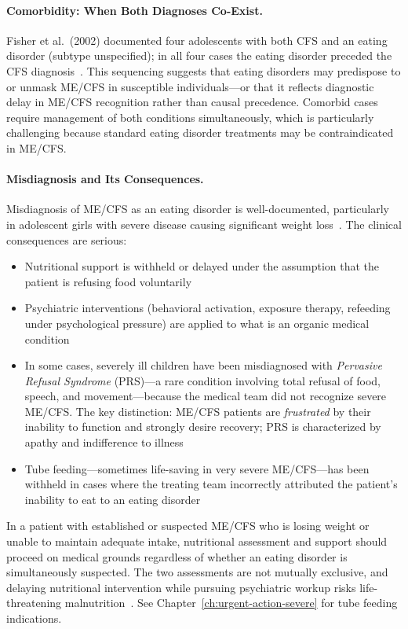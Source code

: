 \paragraph{Comorbidity: When Both Diagnoses Co-Exist.}
Fisher et al.\ (2002) documented four adolescents with both CFS and an eating disorder (subtype unspecified); in all four cases the eating disorder preceded the CFS diagnosis~\cite{Fisher2002cfs-ed}. This sequencing suggests that eating disorders may predispose to or unmask ME/CFS in susceptible individuals---or that it reflects diagnostic delay in ME/CFS recognition rather than causal precedence. Comorbid cases require management of both conditions simultaneously, which is particularly challenging because standard eating disorder treatments may be contraindicated in ME/CFS.

\paragraph{Misdiagnosis and Its Consequences.}
Misdiagnosis of ME/CFS as an eating disorder is well-documented, particularly in adolescent girls with severe disease causing significant weight loss~\cite{Baxter2021malnutrition}. The clinical consequences are serious:

\begin{itemize}
    \item Nutritional support is withheld or delayed under the assumption that the patient is refusing food voluntarily
    \item Psychiatric interventions (behavioral activation, exposure therapy, refeeding under psychological pressure) are applied to what is an organic medical condition
    \item In some cases, severely ill children have been misdiagnosed with \emph{Pervasive Refusal Syndrome} (PRS)---a rare condition involving total refusal of food, speech, and movement---because the medical team did not recognize severe ME/CFS. The key distinction: ME/CFS patients are \emph{frustrated} by their inability to function and strongly desire recovery; PRS is characterized by apathy and indifference to illness~\cite{Baxter2021malnutrition}
    \item Tube feeding---sometimes life-saving in very severe ME/CFS---has been withheld in cases where the treating team incorrectly attributed the patient's inability to eat to an eating disorder
\end{itemize}

\begin{warning}
\label{warn:ed-nutritional-delay}
In a patient with established or suspected ME/CFS who is losing weight or unable to maintain adequate intake, nutritional assessment and support should proceed on medical grounds regardless of whether an eating disorder is simultaneously suspected. The two assessments are not mutually exclusive, and delaying nutritional intervention while pursuing psychiatric workup risks life-threatening malnutrition~\cite{Baxter2021malnutrition}. See Chapter~\ref{ch:urgent-action-severe} for tube feeding indications.
\end{warning}

